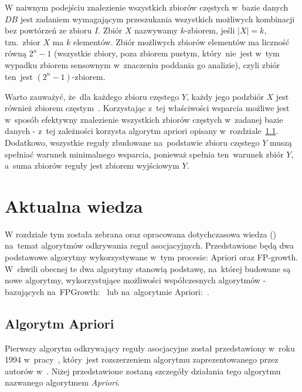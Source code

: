 W naiwnym podejściu znalezienie wszystkich zbiorów częstych w~bazie danych $DB$ jest zadaniem wymagającym przeszukania wszystkich możliwych kombinacji bez powtórzeń ze zbioru $I$. Zbiór $X$ nazwywamy $k$-zbiorem, jeśli $|X|=k$, tzn.~zbior $X$ ma $k$ elementów. Zbiór możliwych zbiorów elementów ma liczność równą $2^n - 1$ (wszystkie zbiory, poza zbiorem pustym, który~nie~jest w~tym wypadku zbiorem sensownym w~znaczeniu poddania go analizie), czyli zbiór ten~jest $(2^n - 1)$-zbiorem.

Warto zauważyć, że~dla każdego zbioru częstego $Y$, każdy jego podzbiór $X$ jest również zbiorem częstym~\cite{Problem:Statement}. Korzystając z~tej właściwości wsparcia możliwe jest w~sposób efektywny znalezienie wszystkich zbiorów częstych w~zadanej bazie danych - z~tej zależności korzysta algorytm apriori opisany w~rozdziale~\ref{apriori:section}. Dodatkowo, wszystkie reguły zbudowane na~podstawie zbioru częstego $Y$ muszą spełniać warunek minimalnego wsparcia, ponieważ spełnia ten~warunek zbiór $Y$, a~suma zbiorów reguły jest zbiorem wyjściowym $Y$.

\section{Aktualna wiedza}
W rozdziale tym została zebrana oraz opracowana dotychczasowa wiedza () na~temat algorytmów odkrywania reguł asocjacyjnych. Przedstawione będą dwa podstawowe algorytmy wykorzystywane w~tym procesie: Apriori oraz FP-growth. W~chwili obecnej te dwa algorytmy stanowią podstawę, na~której budowane są nowe algorytmy, wykorzystujące możliwości współczesnych algorytmów - bazujących na~FPGrowth:~\cite{FP:Like_1, FP:Like_2} lub na~algorytmie Apriori:~\cite{Apriori:Like_1, Apriori:Like_2}.

\subsection{Algorytm Apriori}\label{apriori:section}
Pierwszy algorytm odkrywający reguły asocjacyjne został przedstawiony w~roku 1994 w~pracy~\cite{Apriori:Main}, który~jest rozszerzeniem algorytmu zaprezentowanego przez autorów w~\cite{Problem:Statement}. Niżej przedstawione zostaną szczegóły działania tego algorytmu nazwanego algorytmem \emph{Apriori}.

